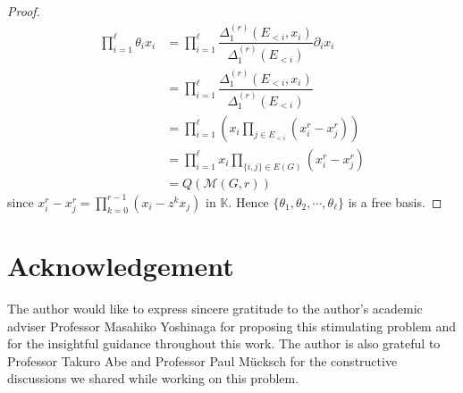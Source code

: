 \documentclass[12pt]{article}
\theoremstyle{plain}%
\theoremstyle{definition}
\begin{document}
\begin{proof}
\begin{align*}
    \prod_{i=1}^\ell \theta_i x_i &= \prod_{i=1}^\ell \dfrac{\Delta^{(r)}_1(E_{<i}, x_{i})}{\Delta^{(r)}_1(E_{<i})}\partial_{i} x_i\\
    &= \prod_{i=1}^\ell \dfrac{\Delta^{(r)}_1(E_{<i}, x_{i})}{\Delta^{(r)}_1(E_{<i})}\\
    &= \prod_{i=1}^\ell (x_i\prod_{j\in E_{<i}} (x_i^{r}-x_j^{r}))\\
    &= \prod_{i=1}^\ell x_i \prod_{\{i,j\}\in E(G)}(x_i^{r}-x_j^{r})\\
    &= Q(\mathcal{M}(G,r))    
\end{align*}
since $x_i^{r}-x_j^{r}=\prod_{k=0}^{r-1}(x_i-z^k x_j)$ in $\mathbb{K}$. Hence $\{\theta_1, \theta_2,\cdots,\theta_\ell\}$ is a free basis. 
\end{proof}


\section{Acknowledgement}
The author would like to express sincere gratitude to the author's academic adviser Professor Masahiko Yoshinaga for proposing this stimulating problem and for the insightful guidance throughout this work. The author is also grateful to Professor Takuro Abe and Professor Paul M{\"u}cksch for the constructive discussions we shared while working on this problem.


\printbibliography
\end{document}
